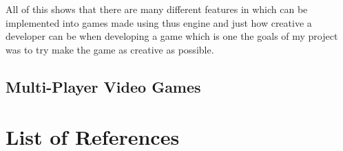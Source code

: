 \documentclass[10pt,a4paperpaper,openright]{book}
\begin{document}
All of this shows that there are many different features in which can be
implemented into games made using thus engine and just how creative a
developer can be when developing a game which is one the goals of my
project was to try make the game as creative as possible.

\section{Multi-Player Video Games}\label{multi-player-video-games}

\backmatter

\chapter{List of References}\label{list-of-references}
\end{document}
